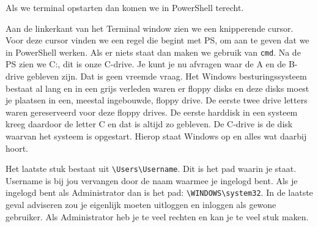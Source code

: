 Als we terminal opstarten dan komen we in PowerShell terecht.

\begin{minipage}[t]{\linewidth}
\raggedright
{}
\end{minipage}
Aan de linkerkant van het Terminal window zien we een knipperende cursor. Voor deze cursor vinden we een regel die begint met PS, om aan te geven dat we in PowerShell werken. Als er niets staat dan maken we gebruik van \texttt{cmd}. Na de PS zien we C:, dit is onze C-drive. Je kunt je nu afvragen waar de A en de B-drive gebleven zijn. Dat is geen vreemde vraag. Het Windows besturingssysteem bestaat al lang en in een grijs verleden waren er floppy disks en deze disks moest je plaatsen in een, meestal ingebouwde, floppy drive. De eerste twee drive letters waren gereserveerd voor deze floppy drives. De eerste harddisk in een systeem kreeg daardoor de letter C en dat is altijd zo gebleven. De C-drive is de disk waarvan het systeem is opgestart. Hierop staat Windows op en alles wat daarbij hoort.

Het laatste stuk bestaat uit \texttt{\textbackslash Users\textbackslash Username}. Dit is het pad waarin je staat. Username is bij jou vervangen door de naam waarmee je ingelogd bent. Als je ingelogd bent als Administrator dan is het pad: \texttt{\textbackslash WINDOWS\textbackslash system32}. In de laatste geval adviseren zou je eigenlijk moeten uitloggen en inloggen als gewone gebruiker. Als Administrator heb je te veel rechten en kan je te veel stuk maken.

